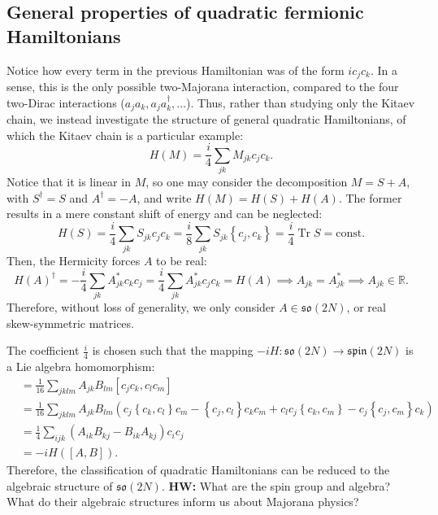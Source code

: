 \documentclass{article}
\DeclareMathOperator{\trace}{Tr}
\newcommand{\hwnote}[1]{{\color{red}\textbf{HW:} #1}}
\begin{document}
\subsection{General properties of quadratic fermionic Hamiltonians}\label{sec:quadratic}
Notice how every term in the previous Hamiltonian was of the form $ic_jc_k$.
In a sense, this is the only possible two-Majorana interaction, compared to the four two-Dirac interactions
($a_j a_k, a_j a_k^\dagger, \dots$).
Thus, rather than studying only the Kitaev chain,
we instead investigate the structure of general quadratic Hamiltonians,
of which the Kitaev chain is a particular example:
\[
    H(M) = \frac{i}{4} \sum_{jk} M_{jk} c_j c_k.
\]
Notice that it is linear in $M$, so one may consider the decomposition $M = S + A$,
with $S^\dagger = S$ and $A^\dagger = -A$, and write $H(M) = H(S) + H(A)$.
The former results in a mere constant shift of energy and can be neglected:
\[
    H(S) = \frac{i}{4} \sum_{jk} S_{jk} c_j c_k = \frac{i}{8}\sum_{jk} S_{jk} \left\{c_j, c_k\right\}
    = \frac{i}{4} \trace S = \mathrm{const.}
\]
Then, the Hermicity forces $A$ to be real:
\[
    H(A)^\dagger = -\frac{i}{4}\sum_{jk} A_{jk}^* c_k c_j = \frac{i}{4} \sum_{jk} A_{jk}^* c_j c_k = H(A)
    \implies A_{jk} = A_{jk}^* \implies A_{jk} \in \mathbb{R}.
\]
Therefore, without loss of generality, we only consider $A \in \mathfrak{so}(2N)$,
or real skew-symmetric matrices.


The coefficient $\frac{i}{4}$ is chosen such that
the mapping $-iH: \mathfrak{so}(2N) \rightarrow \mathfrak{spin}(2N)$ is a Lie algebra homomorphism:
\begin{align*}
    [-iH(A), -iH(B)]
    &= \frac{1}{16} \sum_{jklm} A_{jk} B_{lm} [c_j c_k, c_l c_m] \\
    &= \frac{1}{16} \sum_{jklm} A_{jk} B_{lm} \left(
        c_j \left\{c_k, c_l\right\} c_m
        - \left\{c_j, c_l\right\} c_k c_m
        + c_l c_j \left\{c_k, c_m\right\}
        - c_j \left\{c_j, c_m\right\} c_k
    \right) \\
    &= \frac{1}{4} \sum_{ijk} \left(A_{ik} B_{kj} - B_{ik} A_{kj}\right) c_i c_j \\
    &= -iH([A, B]).
\end{align*}
Therefore, the classification of quadratic Hamiltonians can be reduced to the algebraic structure of $\mathfrak{so}(2N)$.
\hwnote{What are the spin group and algebra? What do their algebraic structures inform us about Majorana physics?}
\end{document}
